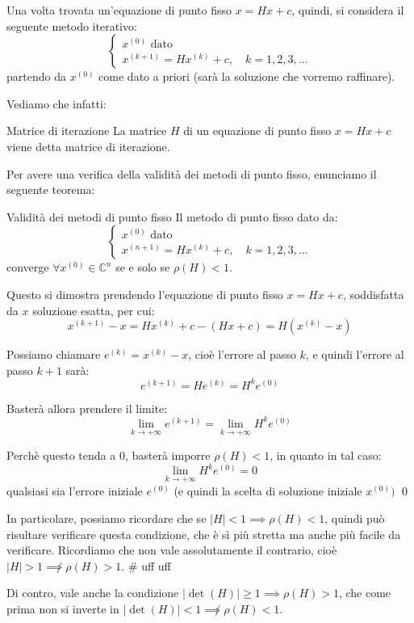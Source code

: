 \documentclass[a4paper,11pt]{article}
\begin{document}
Una volta trovata un'equazione di punto fisso $x = H x + c$, quindi, si considera il seguente metodo iterativo:
\[
	\begin{cases}
		x^{(0)} \text{ dato} \\
		x^{(k + 1)} = H x^{(k)} + c, \quad k = 1, 2, 3, ...
	\end{cases}
\]
partendo da $x^{(0)}$ come dato a priori (sarà la soluzione che vorremo raffinare).

Vediamo che infatti:
\begin{definition}{Matrice di iterazione}
	La matrice $H$ di un equazione di punto fisso $x = H x + c$ viene detta matrice di iterazione.
\end{definition}

Per avere una verifica della validità dei metodi di punto fisso, enunciamo il seguente teorema:
\begin{theorem}{Validità dei metodi di punto fisso}
	Il metodo di punto fisso dato da:
\[
	\begin{cases}
		x^{(0)} \text{ dato} \\
		x^{(n + 1)} = H x^{(k)} + c, \quad k = 1, 2, 3, ...
	\end{cases}
\]
converge $\forall x^{(0)} \in \mathbb{C}^n$ se e solo se $\rho(H) < 1$.
\end{theorem}

Questo si dimostra prendendo l'equazione di punto fisso $x = H x + c$, soddisfatta da $x$ soluzione esatta, per cui:
$$
x^{(k + 1)} - x = H x^{(k)} + c - (H x + c) = H ( x^{(k)} - x )
$$

Possiamo chiamare $e^{(k)} = x^{(k)} - x$, cioè l'errore al passo $k$, e quindi l'errore al passo $k + 1$ sarà:
$$
e^{(k + 1)} = H e^{(k)} = H^k e^{(0)}
$$

Basterà allora prendere il limite:
$$
\lim_{k \rightarrow + \infty} e^{(k + 1)} = \lim_{k \rightarrow + \infty} H^k e^{(0)}
$$

Perchè questo tenda a $0$, basterà imporre $\rho(H) < 1$, in quanto in tal caso:
$$
\lim_{k \rightarrow + \infty} H^k e^{(0)} = 0
$$
qualsiasi sia l'errore iniziale $e^{(0)}$ (e quindi la scelta di soluzione iniziale $x^{(0)})$ \qed

In particolare, possiamo ricordare che se $|H| < 1 \implies \rho(H) < 1$, quindi può risultare verificare questa condizione, che è sì più stretta ma anche più facile da verificare.
Ricordiamo che non vale assolutamente il contrario, cioè $|H| > 1 \not \implies \rho(H) > 1$. # uff uff

Di contro, vale anche la condizione $|\det(H)| \geq 1 \implies \rho(H) > 1$, che come prima non si inverte in $|\det(H)| < 1 \not \implies \rho(H) < 1$.
\end{document}
